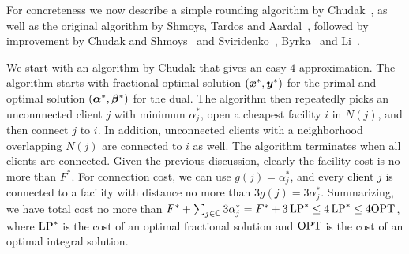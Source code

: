 \documentclass[oneside,final]{ucr}
\begin{document}
For concreteness we now describe a simple rounding algorithm
by Chudak~\cite{Chudak98}, as well as the original algorithm
by Shmoys, Tardos and Aardal~\cite{ShmoysTA97}, followed by
improvement by Chudak and Shmoys~\cite{ChudakS04} and
Sviridenko~\cite{Svi02}, Byrka~\cite{Byrka07} and
Li~\cite{Li11}.

We start with an algorithm by Chudak that gives an easy
$4$-approximation. The algorithm starts with fractional
optimal solution $(\boldsymbol{x}^\ast,\boldsymbol{y}^\ast)$ for the primal and
optimal solution $(\boldsymbol{\alpha}^\ast, \boldsymbol{\beta}^\ast)$ for the
dual. The algorithm then repeatedly picks an unconnnected
client $j$ with minimum $\alpha_j^\ast$, open a cheapest
facility $i$ in $N(j)$, and then connect $j$ to $i$. In
addition, unconnected clients with a neighborhood
overlapping $N(j)$ are connected to $i$ as well. The
algorithm terminates when all clients are connected.  Given
the previous discussion, clearly the facility cost is no
more than $F^\ast$. For connection cost, we can use $g(j) =
\alpha_j^\ast$, and every client $j$ is connected to a
facility with distance no more than $3 g(j) = 3
\alpha_j^\ast$. Summarizing, we have total cost no more than
$F^\ast + \sum_{j\in\mathbb{C}} 3\alpha_j^\ast = F^\ast +
3\,\mbox{\rm LP}^\ast \leq 4\,\mbox{\rm LP}^\ast \leq 4\mbox{\rm OPT}$, where $\mbox{\rm LP}^\ast$
is the cost of an optimal fractional solution and $\mbox{\rm OPT}$ is
the cost of an optimal integral solution.
\end{document}
